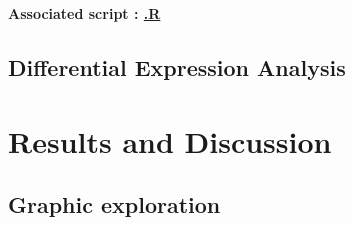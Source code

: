 \documentclass[a4paper, 11pt]{article}
\begin{document}
\begin{multicols}{2}
\begin{scriptsize}	
	
	\textbf{Associated script : \href{https://github.com/leopoldguyot/BINF-F401-Project/*}{.R}}



\end{scriptsize}

\subsection{Differential Expression Analysis}
\lipsum[4]

\section{Results and Discussion}
\lipsum
\subsection{Graphic exploration}
\lipsum[5]



\end{multicols}
\end{document}
